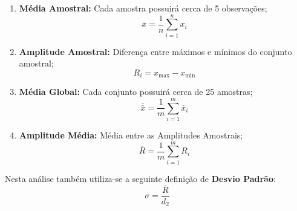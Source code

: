 \documentclass{article}
\begin{document}
                \begin{multicols}{2}
                    \begin{enumerate}[rightmargin = \leftmargin, noitemsep]
                        \item \textbf{Média Amostral:} Cada amostra possuirá cerca de 5 observações;
                            \begin{equation}
                                \boxed{
                                    \overline{x} = \frac{1}{n} \sum_{i=1}^{n} x_{i}
                                }
                            \end{equation}
    
                        \item \textbf{Amplitude Amostral:} Diferença entre máximos e mínimos do conjunto amostral;
                            \begin{equation}
                                \boxed{
                                    R_{i} = x_{\max} - x_{\min}
                                }
                            \end{equation}
                    \columnbreak
                        \item \textbf{Média Global:} Cada conjunto possuirá cerca de 25 amostras;
                            \begin{equation}
                                \boxed{
                                    \overline{\overline{x}} = \frac{1}{m} \sum_{i=1}^{m} \overline{x}_{i}
                                }\label{eq.mediaGlobal}
                            \end{equation}
    
                        \item \textbf{Amplitude Média:} Média entre as Amplitudes Amostrais;
                            \begin{equation}
                                \boxed{
                                    \overline{R} = \frac{1}{m} \sum_{i=1}^{m} R_{i}
                                }
                            \end{equation}
                    \end{enumerate}
                \end{multicols} \noindent
            Nesta análise também utiliza-se a seguinte definição de \textbf{Desvio Padrão}:
                \begin{equation}
                    \boxed{
                        \sigma = \frac{\overline{R}}{d_{2}}
                    }\label{eq.desvP}
                \end{equation}
\end{document}
